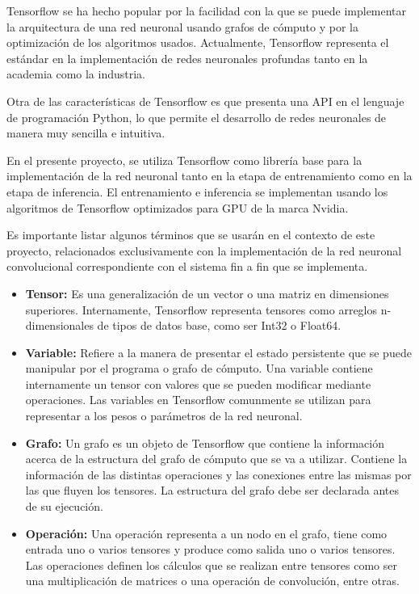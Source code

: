     Tensorflow se ha hecho popular por la facilidad con la que se puede implementar la arquitectura de una red neuronal usando grafos
    de cómputo y por la optimización de los algoritmos usados. Actualmente, Tensorflow representa el estándar en la implementación de 
    redes neuronales profundas tanto en la academia como la industria. 

    Otra de las características de Tensorflow es que presenta una API en el lenguaje de programación Python, lo que permite el desarrollo
    de redes neuronales de manera muy sencilla e intuitiva. 

    En el presente proyecto, se utiliza Tensorflow como librería base para la implementación de la red neuronal tanto en la etapa de 
    entrenamiento como en la etapa de inferencia. El entrenamiento e inferencia se implementan usando los algoritmos de Tensorflow 
    optimizados para GPU de la marca Nvidia.%

    Es importante listar algunos términos que se usarán en el contexto de este proyecto, relacionados exclusivamente con la implementación 
    de la red neuronal convolucional correspondiente con el sistema fin a fin que se implementa. 
    \begin{itemize}
        \item \textbf{Tensor:} Es una generalización de un vector o una matriz en dimensiones superiores. Internamente, 
        Tensorflow representa tensores como arreglos n-dimensionales de tipos de datos base, como ser Int32 o Float64.

        \item \textbf{Variable: } Refiere a la manera de presentar el estado persistente que se puede manipular por el 
        programa o grafo de cómputo. Una variable contiene internamente un tensor con valores que se pueden modificar 
        mediante operaciones. Las variables en Tensorflow comunmente se utilizan para representar a los pesos o parámetros 
        de la red neuronal.

        \item \textbf{Grafo:} Un grafo es un objeto de Tensorflow que contiene la información acerca de la estructura 
        del grafo de cómputo que se va a utilizar. Contiene la información de las distintas operaciones y las conexiones 
        entre las mismas por las que fluyen los tensores. La estructura del grafo debe ser declarada antes de su ejecución.

        \item \textbf{Operación:} Una operación representa a un nodo en el grafo, tiene como entrada uno o varios 
        tensores y produce como salida uno o varios tensores. Las operaciones definen los cálculos que se realizan entre 
        tensores como ser una multiplicación de matrices o una operación de convolución, entre otras.
    \end{itemize}

